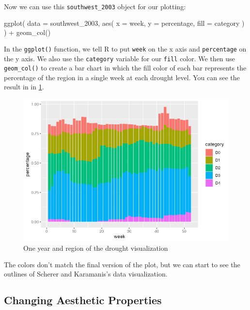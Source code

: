 \documentclass[
]{book}
\newenvironment{Shaded}{\begin{snugshade}}{\end{snugshade}}
\newcommand{\AttributeTok}[1]{\textcolor[rgb]{0.77,0.63,0.00}{#1}}
\newcommand{\FunctionTok}[1]{\textcolor[rgb]{0.00,0.00,0.00}{#1}}
\newcommand{\NormalTok}[1]{#1}
\newcommand{\SpecialCharTok}[1]{\textcolor[rgb]{0.00,0.00,0.00}{#1}}
\begin{document}
Now we can use this \texttt{southwest\_2003} object for our plotting:

\begin{Shaded}
\begin{Highlighting}[]
\FunctionTok{ggplot}\NormalTok{(}
  \AttributeTok{data =}\NormalTok{ southwest\_2003,}
  \FunctionTok{aes}\NormalTok{(}
    \AttributeTok{x =}\NormalTok{ week,}
    \AttributeTok{y =}\NormalTok{ percentage,}
    \AttributeTok{fill =}\NormalTok{ category}
\NormalTok{  )}
\NormalTok{) }\SpecialCharTok{+}
  \FunctionTok{geom\_col}\NormalTok{()}
\end{Highlighting}
\end{Shaded}

In the \texttt{ggplot()} function, we tell R to put \texttt{week} on the x axis and \texttt{percentage} on the y axis. We also use the \texttt{category} variable for our \texttt{fill} color. We then use \texttt{geom\_col()} to create a bar chart in which the fill color of each bar represents the percentage of the region in a single week at each drought level. You can see the result in in \ref{fig:southwest-2003-no-style-plot}.

\begin{figure}
\includegraphics[width=1\linewidth]{data-viz_files/figure-latex/southwest-2003-no-style-plot-1} \caption{One year and region of the drought visualization}\label{fig:southwest-2003-no-style-plot}
\end{figure}

The colors don't match the final version of the plot, but we can start to see the outlines of Scherer and Karamanis's data visualization.

\hypertarget{changing-aesthetic-properties}{%
\subsection*{Changing Aesthetic Properties}\label{changing-aesthetic-properties}}
\end{document}
